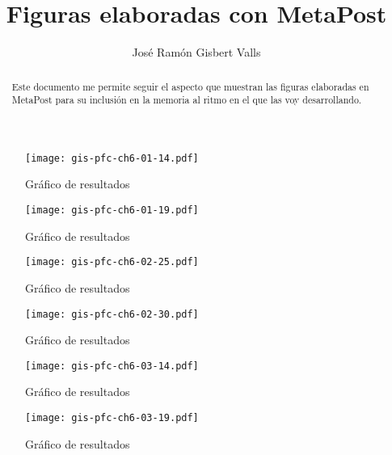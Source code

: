 \documentclass[a4paper,12pt]				{article}
\title{Figuras elaboradas con MetaPost}
\author{José Ramón Gisbert Valls}
\begin{document}
\maketitle{}

\begin{abstract}
	Este documento me permite seguir el aspecto que muestran las
	figuras elaboradas en MetaPost para su inclusión en la memoria al
	ritmo en el que las voy desarrollando.
\end{abstract}

\listoffigures

\clearpage


\begin{figure}
	\begin{center}
		\texttt{[image: gis-pfc-ch6-01-14.pdf]}
	\end{center}
	\caption{Gráfico de resultados}
	\label{fig:gis-pfc-ch6-01-14}
\end{figure}

\begin{figure}
	\begin{center}
		\texttt{[image: gis-pfc-ch6-01-19.pdf]}
	\end{center}
	\caption{Gráfico de resultados}
	\label{fig:gis-pfc-ch6-01-19}
\end{figure}

\begin{figure}
	\begin{center}
		\texttt{[image: gis-pfc-ch6-02-25.pdf]}
	\end{center}
	\caption{Gráfico de resultados}
	\label{fig:gis-pfc-ch6-02-25}
\end{figure}

\begin{figure}
	\begin{center}
		\texttt{[image: gis-pfc-ch6-02-30.pdf]}
	\end{center}
	\caption{Gráfico de resultados}
	\label{fig:gis-pfc-ch6-02-30}
\end{figure}

\begin{figure}
	\begin{center}
		\texttt{[image: gis-pfc-ch6-03-14.pdf]}
	\end{center}
	\caption{Gráfico de resultados}
	\label{fig:gis-pfc-ch6-03-14}
\end{figure}

\begin{figure}
	\begin{center}
		\texttt{[image: gis-pfc-ch6-03-19.pdf]}
	\end{center}
	\caption{Gráfico de resultados}
	\label{fig:gis-pfc-ch6-03-19}
\end{figure}
\end{document}
